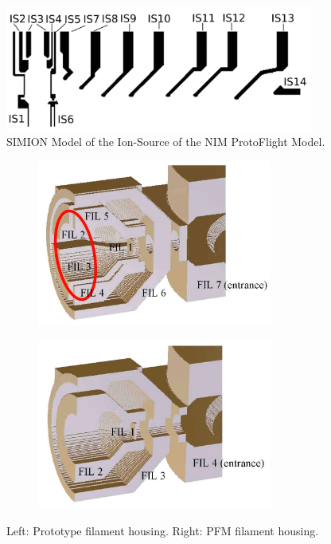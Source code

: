 		\begin{figure}[h] %
			\centering
			\includegraphics[width=0.9\textwidth]{Setup/ISFlight_bearb.png}
			\caption{SIMION Model of the Ion-Source of the NIM ProtoFlight Model.}
			\label{fig:SetupPFMISSim}
		\end{figure}
		\begin{figure}[h] %
			\begin{subfigure}{0.5\textwidth}
				\centering
				\includegraphics[width =0.85\textwidth]{Setup/Proto_FilEl_sim.jpg}
			\end{subfigure}
			\begin{subfigure}{0.5\textwidth}
				\centering
				\includegraphics[width = 0.85\textwidth]{Setup/PFM_FilEl_sim.jpg}
			\end{subfigure}
			\caption{Left: Prototype filament housing. Right: PFM filament housing.}
			\label{fig:SetupFilElSim}
		\end{figure}

